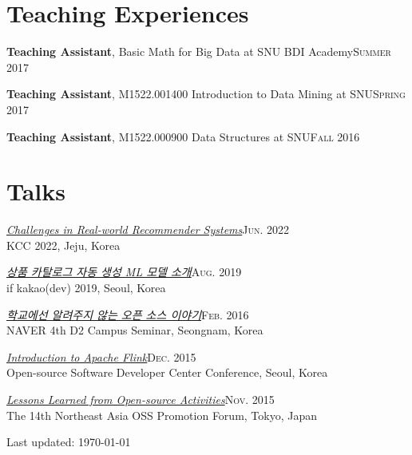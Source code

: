 \documentclass[11pt,a4paper]{article}
\renewenvironment{itemize}{
  \begin{list}{}{
    \setlength{\leftmargin}{1em}
    \setlength{\itemsep}{0.25em}
    \setlength{\parskip}{0pt}
    \setlength{\parsep}{0.25em}
  }
}{
  \end{list}
}
\begin{document}
\section*{Teaching Experiences}
\begin{itemize}
  \setlength\itemsep{0.1em}
  \item \textbf{Teaching Assistant}, Basic Math for Big Data at SNU BDI Academy\hfill\textsc{Summer 2017}
  \item \textbf{Teaching Assistant}, M1522.001400 Introduction to Data Mining at SNU\hfill\textsc{Spring 2017}
  \item \textbf{Teaching Assistant}, M1522.000900 Data Structures at SNU\hfill\textsc{Fall 2016}
\end{itemize}

\section*{Talks}
\begin{itemize}
  \item \href{https://speakerdeck.com/chiwanpark/challenges-in-real-world-recommender-systems}{\textit{Challenges in Real-world Recommender Systems}}\hfill\textsc{Jun. 2022}\\
        KCC 2022, Jeju, Korea
  \item \href{http://bit.ly/chiwanpark-ifkakao2019-new}{\textit{상품 카탈로그 자동 생성 ML 모델 소개}}\hfill\textsc{Aug. 2019}\\
        if kakao(dev) 2019, Seoul, Korea
  \item \href{http://j.mp/d2-campus-seminar-4th-park}{\textit{학교에선 알려주지 않는 오픈 소스 이야기}}\hfill\textsc{Feb. 2016}\\
        NAVER 4th D2 Campus Seminar, Seongnam, Korea
  \item \href{http://j.mp/ossdevconf-2015-park}{\textit{Introduction to Apache Flink}}\hfill\textsc{Dec. 2015}\\
        Open-source Software Developer Center Conference, Seoul, Korea
  \item \href{http://j.mp/cjkossforum-2015-park}{\textit{Lessons Learned from Open-source Activities}}\hfill\textsc{Nov. 2015}\\
        The 14th Northeast Asia OSS Promotion Forum, Tokyo, Japan
\end{itemize}

\bigskip
{\small Last updated: \today}
\end{document}
